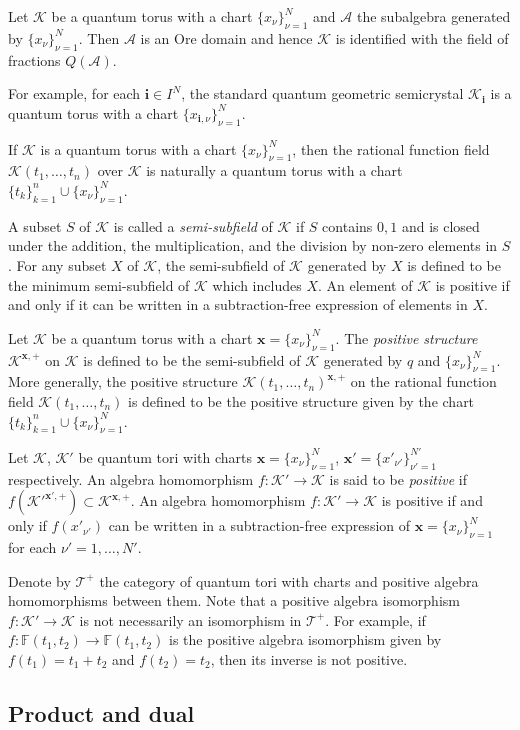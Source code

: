 \documentclass[12pt,a4paper]{article}
\newcommand\A{{\mathcal A}}
\newcommand\K{{\mathcal K}}
\renewcommand\i{{\mathbf i}}
\newcommand\x{{\mathbf x}}
\newcommand\QT{{\mathcal{T}}}
\newcommand\F{{\mathbb F}} %
\theoremstyle{plain} %
\theoremstyle{definition} %
\theoremstyle{definition} %
\numberwithin{theorem}{section}
\numberwithin{equation}{section}
\numberwithin{figure}{section}
\numberwithin{table}{section}
\begin{document}
Let $\K$ be a quantum torus with a chart $\{x_\nu\}_{\nu=1}^N$
and $\A$ the subalgebra generated by $\{x_\nu\}_{\nu=1}^N$.
Then $\A$ is an Ore domain and hence
$\K$ is identified with the field of fractions $Q(\A)$.

For example, for each $\i\in I^N$,
the standard quantum geometric semicrystal $\K_\i$ is a quantum torus 
with a chart $\{x_{\i,\nu}\}_{\nu=1}^N$.

If $\K$ is a quantum torus with a chart $\{x_\nu\}_{\nu=1}^N$, 
then the rational function field $\K(t_1,\ldots,t_n)$ over $\K$
is naturally a quantum torus with 
a chart $\{t_k\}_{k=1}^n\cup\{x_\nu\}_{\nu=1}^N$.

A subset $S$ of $\K$ is called a {\em semi-subfield} of $\K$
if $S$ contains $0,1$ and is closed under the addition, 
the multiplication, and the division by non-zero elements in $S$.
For any subset $X$ of $\K$, 
the semi-subfield of $\K$ generated by $X$ is defined 
to be the minimum semi-subfield of $\K$ which includes $X$.
An element of $\K$ is positive if and only if
it can be written in a subtraction-free expression of elements in $X$.

Let $\K$ be a quantum torus with a chart $\x=\{x_\nu\}_{\nu=1}^N$.
The {\em positive structure} $\K^{\x,+}$ on $\K$ is defined to be 
the semi-subfield of $\K$ generated by $q$ and $\{x_\nu\}_{\nu=1}^N$.
More generally, the positive structure $\K(t_1,\ldots,t_n)^{\x,+}$
on the rational function field $\K(t_1,\ldots,t_n)$
is defined to be the positive structure given 
by the chart $\{t_k\}_{k=1}^n\cup\{x_\nu\}_{\nu=1}^N$.

Let $\K$, $\K'$ be quantum tori with 
charts $\x=\{x_\nu\}_{\nu=1}^N$, $\x'=\{x'_{\nu'}\}_{\nu'=1}^{N'}$ respectively.
An algebra homomorphism $f:\K'\to\K$ is said to be {\em positive}
if $f(\K'^{\x',+})\subset\K^{\x,+}$.
An algebra homomorphism $f:\K'\to\K$ is positive if and only if
$f(x'_{\nu'})$ can be written in a subtraction-free expression 
of $\x=\{x_\nu\}_{\nu=1}^N$ for each $\nu'=1,\ldots,N'$.

Denote by $\QT^+$ the category of quantum tori with charts and 
positive algebra homomorphisms between them.
Note that a positive algebra isomorphism $f:\K'\to\K$ 
is not necessarily an isomorphism in $\QT^+$.
For example, if $f:\F(t_1,t_2)\to\F(t_1,t_2)$ is the positive algebra isomorphism 
given by $f(t_1)=t_1+t_2$ and $f(t_2)=t_2$, then its inverse is not positive.

\subsection{Product and dual}
\end{document}
